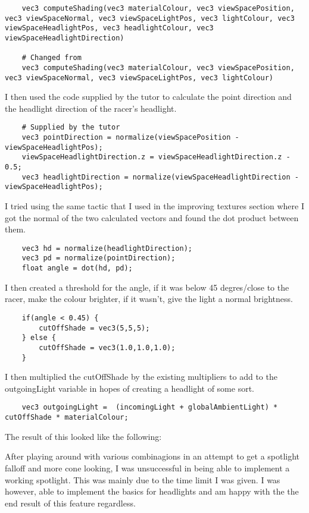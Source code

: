 \documentclass[11pt, oneside, a4paper]{article}
\begin{document}
\begin{lstlisting}
    vec3 computeShading(vec3 materialColour, vec3 viewSpacePosition, vec3 viewSpaceNormal, vec3 viewSpaceLightPos, vec3 lightColour, vec3 viewSpaceHeadlightPos, vec3 headlightColour, vec3 viewSpaceHeadlightDirection)

    # Changed from
    vec3 computeShading(vec3 materialColour, vec3 viewSpacePosition, vec3 viewSpaceNormal, vec3 viewSpaceLightPos, vec3 lightColour)
\end{lstlisting}

I then used the code supplied by the tutor to calculate the point direction and the headlight direction of the racer's headlight.

\begin{lstlisting}
    # Supplied by the tutor
    vec3 pointDirection = normalize(viewSpacePosition - viewSpaceHeadlightPos);
    viewSpaceHeadlightDirection.z = viewSpaceHeadlightDirection.z - 0.5;
    vec3 headlightDirection = normalize(viewSpaceHeadlightDirection - viewSpaceHeadlightPos);
\end{lstlisting}

I tried using the same tactic that I used in the improving textures section where I got the normal of the two calculated vectors and found the dot product between them. 
\begin{lstlisting}
    vec3 hd = normalize(headlightDirection);
    vec3 pd = normalize(pointDirection);  
    float angle = dot(hd, pd);
\end{lstlisting}

I then created a threshold for the angle, if it was below 45 degres/close to the racer, make the colour brighter, if it wasn't, give the light a normal brightness.
\begin{lstlisting}
    if(angle < 0.45) {
        cutOffShade = vec3(5,5,5);
    } else {
        cutOffShade = vec3(1.0,1.0,1.0);
    }
\end{lstlisting}

I then multiplied the cutOffShade by the existing multipliers to add to the outgoingLight variable in hopes of creating a headlight of some sort.
\begin{lstlisting}
    vec3 outgoingLight =  (incomingLight + globalAmbientLight) * cutOffShade * materialColour;
\end{lstlisting}

The result of this looked like the following:


After playing around with various combinagions in an attempt to get a spotlight falloff and more cone looking, I was unsuccessful in being able to implement a working spotlight. This was mainly due to the time limit I was given. I was however, able to implement the basics for headlights and am happy with the the end result of this feature regardless.
\end{document}
